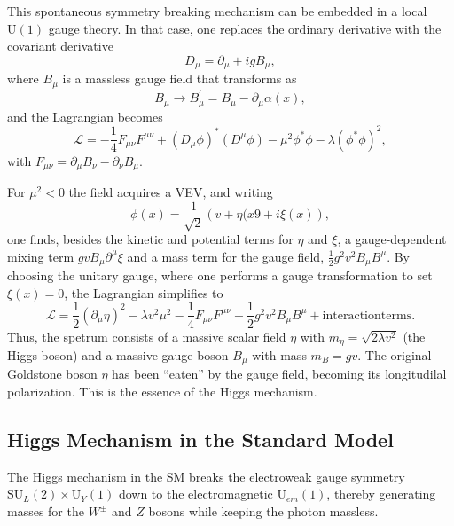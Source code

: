 This spontaneous symmetry breaking mechanism can be embedded in a local $\mathrm{U}(1)$ gauge theory. In that case, one replaces the ordinary derivative with the covariant derivative
\begin{equation}
D_\mu = \partial_\mu + igB_\mu,
\end{equation}
where $B_\mu$ is a massless gauge field that transforms as
\begin{equation}
B_\mu \to B_\mu^\prime= B_\mu - \partial_\mu \alpha(x),
\end{equation}
and the Lagrangian becomes
\begin{equation}
\mathcal{L}=-\frac{1}{4}F_{\mu\nu}F^{\mu\nu}+(D_\mu\phi)^*(D^\mu\phi) - \mu^2\phi^*\phi - \lambda(\phi^*\phi)^2,
\end{equation}
with $F_{\mu\nu}=\partial_\mu B_\nu - \partial_\nu B_\mu$.

For $\mu^2<0$ the field acquires a VEV, and writing
\begin{equation}
\phi(x) = \frac{1}{\sqrt{2}} \left( v + \eta(x9 +i\xi(x)\right),
\end{equation}
one finds, besides the kinetic and potential terms for $\eta$ and $\xi$, a gauge-dependent mixing term $gvB_\mu\partial^\mu\xi$ and a mass term for the gauge field, $\frac{1}{2}g^2v^2B_\mu B^\mu$. By choosing the unitary gauge, where one performs a gauge transformation to set $\xi(x)=0$, the Lagrangian simplifies to
\begin{equation}
\mathcal{L}=\frac{1}{2}(\partial_\mu\eta)^2 - \lambda v^2\mu^2 - \frac{1}{4}F_{\mu\nu}F^{\mu\nu}+\frac{1}{2}g^2v^2B_\mu B^\mu + \mathrm{interaction terms}.
\end{equation}
Thus, the spetrum consists of a massive scalar field $\eta$ with $m_\eta=\sqrt{2\lambda v^2}$ (the Higgs boson) and a massive gauge boson $B_\mu$ with mass $m_B=gv$. The original Goldstone boson $\eta$ has been ``eaten'' by the gauge field, becoming its longitudilal polarization. This is the essence of the Higgs mechanism.


\subsection{Higgs Mechanism in the Standard Model}


The Higgs mechanism in the SM breaks the electroweak gauge symmetry $\mathrm{SU}_L(2) \times \mathrm{U}_Y(1)$ down to the electromagnetic $\mathrm{U}_{em}(1)$, thereby generating masses for the $W^\pm$ and $Z$ bosons while keeping the photon massless.

